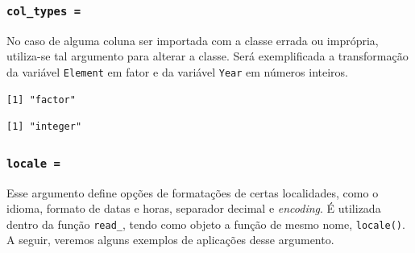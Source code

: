 \documentclass[
  brazilian,
]{book}
\newenvironment{Shaded}{\begin{snugshade}}{\end{snugshade}}
\newcommand{\AttributeTok}[1]{\textcolor[rgb]{0.77,0.63,0.00}{#1}}
\newcommand{\FunctionTok}[1]{\textcolor[rgb]{0.00,0.00,0.00}{#1}}
\newcommand{\NormalTok}[1]{#1}
\newcommand{\OtherTok}[1]{\textcolor[rgb]{0.56,0.35,0.01}{#1}}
\newcommand{\SpecialCharTok}[1]{\textcolor[rgb]{0.00,0.00,0.00}{#1}}
\newcommand{\StringTok}[1]{\textcolor[rgb]{0.31,0.60,0.02}{#1}}
\begin{document}
\hypertarget{col_types}{%
\subsubsection*{\texorpdfstring{\texttt{col\_types\ =}}{col\_types =}}\label{col_types}}

No caso de alguma coluna ser importada com a classe errada ou imprópria, utiliza-se tal argumento para alterar a classe. Será exemplificada a transformação da variável \texttt{Element} em fator e da variável \texttt{Year} em números inteiros.

\begin{Shaded}
\end{Shaded}

\begin{verbatim}
[1] "factor"
\end{verbatim}

\begin{verbatim}
[1] "integer"
\end{verbatim}

\hypertarget{locale}{%
\subsubsection*{\texorpdfstring{\texttt{locale\ =}}{locale =}}\label{locale}}

Esse argumento define opções de formatações de certas localidades, como o idioma, formato de datas e horas, separador decimal e \emph{encoding}. É utilizada dentro da função \texttt{read\_}, tendo como objeto a função de mesmo nome, \texttt{locale()}. A seguir, veremos alguns exemplos de aplicações desse argumento.
\end{document}
